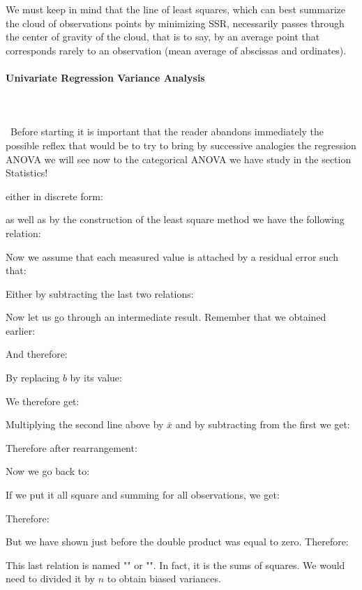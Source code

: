 	\begin{tcolorbox}[title=Remark,colframe=black,arc=10pt]
We must keep in mind that the line of least squares, which can best summarize the cloud of observations points by minimizing SSR, necessarily passes through the center of gravity of the cloud, that is to say, by an average point that corresponds rarely to an observation (mean average of abscissas and ordinates).
	\end{tcolorbox}
	
	\pagebreak
	\paragraph{Univariate Regression Variance Analysis}\label{univariate regression variance analysis}\mbox{}\\\\\
	Before starting it is important that the reader abandons immediately the possible reflex that would be to try to bring by successive analogies the regression ANOVA we will see now to the categorical ANOVA we have study in the section Statistics!
	
	either in discrete form:
	
	as well as by the construction of the least square method we have the following relation:
	
	Now we assume that each measured value is attached by a residual error such that:
	
	Either by subtracting the last two relations:
	
	Now let us go through an intermediate result. Remember that we obtained earlier:
	
	And therefore:
	
	By replacing $b$ by its value:
	
	We therefore get:
	
	Multiplying the second line above by $\bar{x}$ and by subtracting from the first we get:
	
	Therefore after rearrangement:
	
	Now we go back to:
	
	If we put it all square and summing for all observations, we get:
	
	Therefore:
	
	But we have shown just before the double product was equal to zero. Therefore:
	
	This last relation is named "" or "". In fact, it is the sums of squares. We would need to divided it by $n$ to obtain biased variances.
	

